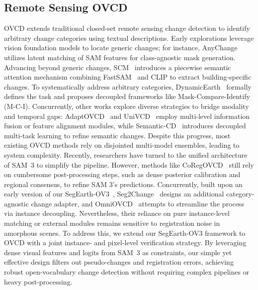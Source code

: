 \documentclass[twocolumn,switch,times]{article}
\newcommand{\samov}{SegEarth-OV\textcolor{cvprpink}{3}\xspace}
\begin{document}
\subsection{Remote Sensing OVCD}

OVCD extends traditional closed-set remote sensing change detection to identify arbitrary change categories using textual descriptions. Early explorations leverage vision foundation models to locate generic changes; for instance, AnyChange~\citep{zheng2024segment} utilizes latent matching of SAM features for class-agnostic mask generation. Advancing beyond generic changes, SCM~\citep{tan2023segment} introduces a piecewise semantic attention mechanism combining FastSAM~\citep{zhao2023fast} and CLIP to extract building-specific changes. To systematically address arbitrary categories, DynamicEarth~\citep{li2026dynamicearth} formally defines the task and proposes decoupled frameworks like Mask-Compare-Identify (M-C-I). Concurrently, other works explore diverse strategies to bridge modality and temporal gaps: AdaptOVCD~\citep{dou2026adaptovcd} and UniVCD~\citep{zhu2025univcd} employ multi-level information fusion or feature alignment modules, while Semantic-CD~\citep{zhu2025semantic} introduces decoupled multi-task learning to refine semantic changes.
Despite this progress, most existing OVCD methods rely on disjointed multi-model ensembles, leading to system complexity. Recently, researchers have turned to the unified architecture of SAM~3 to simplify the pipeline. However, methods like CoRegOVCD~\citep{tang2026coregovcd} still rely on cumbersome post-processing steps, such as dense posterior calibration and regional consensus, to refine SAM 3's predictions. Concurrently, built upon an early version of our \samov~\citep{li2025segearthov3}, Seg2Change~\citep{su2026seg2change} designs an additional category-agnostic change adapter, and OmniOVCD~\citep{zhang2026omniovcd} attempts to streamline the process via instance decoupling. Nevertheless, their reliance on pure instance-level matching or external modules remains sensitive to registration noise in amorphous scenes. To address this, we extend our \samov framework to OVCD with a joint instance- and pixel-level verification strategy. By leveraging dense visual features and logits from SAM~3 as constraints, our simple yet effective design filters out pseudo-changes and registration errors, achieving robust open-vocabulary change detection without requiring complex pipelines or heavy post-processing.
\end{document}
